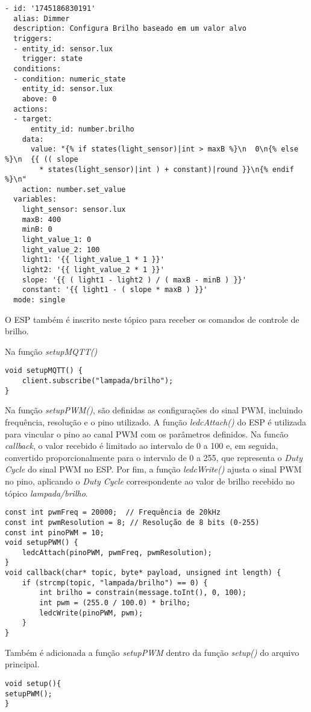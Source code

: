 \documentclass[]{abntex2}
\begin{document}
\begin{verbatim}
- id: '1745186830191'
  alias: Dimmer
  description: Configura Brilho baseado em um valor alvo
  triggers:
  - entity_id: sensor.lux
    trigger: state
  conditions:
  - condition: numeric_state
    entity_id: sensor.lux
    above: 0
  actions:
  - target:
      entity_id: number.brilho
    data:
      value: "{% if states(light_sensor)|int > maxB %}\n  0\n{% else %}\n  {{ (( slope
        * states(light_sensor)|int ) + constant)|round }}\n{% endif %}\n"
    action: number.set_value
  variables:
    light_sensor: sensor.lux
    maxB: 400
    minB: 0
    light_value_1: 0
    light_value_2: 100
    light1: '{{ light_value_1 * 1 }}'
    light2: '{{ light_value_2 * 1 }}'
    slope: '{{ ( light1 - light2 ) / ( maxB - minB ) }}'
    constant: '{{ light1 - ( slope * maxB ) }}'
  mode: single
\end{verbatim}

O ESP também é inscrito neste tópico para receber os comandos de controle de
brilho.

Na função \textit{setupMQTT()}
\begin{verbatim}
void setupMQTT() {
	client.subscribe("lampada/brilho");
}
\end{verbatim}

Na função \textit{setupPWM()}, são definidas as configurações do sinal PWM,
incluindo frequência, resolução e o pino utilizado.
A função \textit{ledcAttach()} do ESP é utilizada para vincular o pino
ao canal PWM com os parâmetros definidos.
Na funcão \textit{callback}, o valor recebido é limitado ao intervalo de 0 a 100 e, em seguida, convertido
proporcionalmente para o intervalo de 0 a 255, que representa o \textit{Duty
Cycle} do sinal PWM no ESP.
Por fim, a função \textit{ledcWrite()} ajusta o sinal PWM no pino, aplicando o
\textit{Duty Cycle} correspondente ao valor de brilho recebido no tópico
\textit{lampada/brilho}.

\begin{verbatim}
const int pwmFreq = 20000;  // Frequência de 20kHz
const int pwmResolution = 8; // Resolução de 8 bits (0-255)
const int pinoPWM = 10;
void setupPWM() {
	ledcAttach(pinoPWM, pwmFreq, pwmResolution);
}
void callback(char* topic, byte* payload, unsigned int length) {
	if (strcmp(topic, "lampada/brilho") == 0) {
		int brilho = constrain(message.toInt(), 0, 100);
		int pwm = (255.0 / 100.0) * brilho;
		ledcWrite(pinoPWM, pwm);
	}
}
\end{verbatim}
Também é adicionada a função \textit{setupPWM} dentro da função
\textit{setup()} do arquivo principal.
\begin{verbatim}
void setup(){
setupPWM();
}
\end{verbatim}
\end{document}
